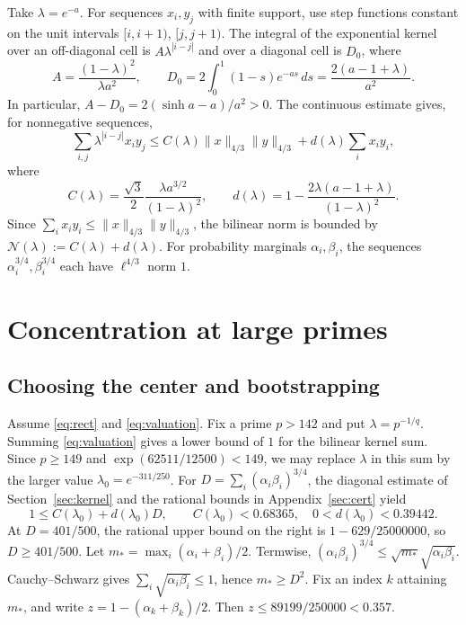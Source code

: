 \documentclass[11pt,a4paper]{article}
\begin{document}
Take \(\lambda=e^{-a}\). For sequences \(x_i,y_j\) with finite
support, use step functions constant on the unit intervals
\([i,i+1)\), \([j,j+1)\). The integral of the exponential kernel over
an off-diagonal cell is \(A\lambda^{|i-j|}\) and over a diagonal
cell is \(D_0\), where
\[
 A=\frac{(1-\lambda)^2}{\lambda a^2},\qquad
 D_0=2\int_0^1(1-s)e^{-as}\,ds=\frac{2(a-1+\lambda)}{a^2}.
\]
In particular, \(A-D_0=2(\sinh a-a)/a^2>0\). The continuous
estimate gives, for nonnegative sequences,
\[
 \sum_{i,j}\lambda^{|i-j|}x_i y_j
 \le C(\lambda)\|x\|_{4/3}\|y\|_{4/3}
             +d(\lambda)\sum_i x_i y_i,
\]
where
\[
 C(\lambda)=\frac{\sqrt3}{2}
               \frac{\lambda a^{3/2}}{(1-\lambda)^2},
 \qquad
 d(\lambda)=1-\frac{2\lambda(a-1+\lambda)}{(1-\lambda)^2}.
\]
Since \(\sum_i x_i y_i\le\|x\|_{4/3}\|y\|_{4/3}\), the bilinear norm
is bounded by \(\mathcal N(\lambda):=C(\lambda)+d(\lambda)\).
For probability marginals \(\alpha_i,\beta_i\), the sequences
\(\alpha_i^{3/4},\beta_i^{3/4}\) each have \(\ell^{4/3}\) norm \(1\).

\section{Concentration at large primes}\label{sec:large}

\subsection{Choosing the center and bootstrapping}

Assume \eqref{eq:rect} and \eqref{eq:valuation}. Fix a prime \(p>142\)
and put \(\lambda=p^{-1/q}\). Summing \eqref{eq:valuation} gives
a lower bound of \(1\) for the bilinear kernel sum. Since \(p\ge149\)
and \(\exp(62511/12500)<149\), we may replace \(\lambda\) in this sum
by the larger value \(\lambda_0=e^{-311/250}\). For
\(D=\sum_i(\alpha_i\beta_i)^{3/4}\), the diagonal estimate of
Section~\ref{sec:kernel} and the rational bounds in
Appendix~\ref{sec:cert} yield
\[
 1\le C(\lambda_0)+d(\lambda_0)D,\qquad
 C(\lambda_0)<0.68365,\quad 0<d(\lambda_0)<0.39442 .
\]
At \(D=401/500\), the rational upper bound on the right is
\(1-629/25000000\), so \(D\ge401/500\). Let
\(m_*=\max_i(\alpha_i+\beta_i)/2\). Termwise,
\((\alpha_i\beta_i)^{3/4}\le\sqrt{m_*}\sqrt{\alpha_i\beta_i}\).
Cauchy--Schwarz gives \(\sum_i\sqrt{\alpha_i\beta_i}\le1\), hence
\(m_*\ge D^2\). Fix an index \(k\) attaining \(m_*\), and write
\(z=1-(\alpha_k+\beta_k)/2\). Then \(z\le 89199/250000<0.357\).
\end{document}
